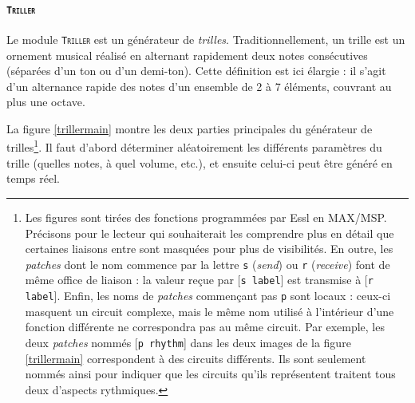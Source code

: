 \documentclass[a4paper,12pt]{article}
\newcommand{\module}[1]{\texttt{\textsc{#1}}}
\newcommand{\patch}[1]{[\texttt{#1}]}
\begin{document}
\paragraph{\module{Triller} \\} %

Le module \module{Triller} est un générateur de \emph{trilles}. Traditionnellement, un trille est un ornement musical réalisé en alternant rapidement deux notes consécutives (séparées d'un ton ou d'un demi-ton). Cette définition est ici élargie : il s'agit d'un alternance rapide des notes d'un ensemble de 2 à 7 éléments, couvrant au plus une octave.

La figure \ref{trillermain} montre les deux parties principales du générateur de trilles\footnote{Les figures sont tirées des fonctions programmées par Essl en MAX/MSP. Précisons pour le lecteur qui souhaiterait les comprendre plus en détail que certaines liaisons entre sont masquées pour plus de visibilités. En outre, les \emph{patches} dont le nom commence par la lettre \texttt{s} (\emph{send}) ou \texttt{r} (\emph{receive}) font de même office de liaison : la valeur reçue par \patch{s label} est transmise à \patch{r label}. Enfin, les noms de \emph{patches} commençant pas \texttt{p} sont locaux : ceux-ci masquent un circuit complexe, mais le même nom utilisé à l'intérieur d'une fonction différente ne correspondra pas au même circuit. Par exemple, les deux \emph{patches} nommés \patch{p rhythm} dans les deux images de la figure \ref{trillermain} correspondent à des circuits différents. Ils sont seulement nommés ainsi pour indiquer que les circuits qu'ils représentent traitent tous deux d'aspects rythmiques.}. Il faut d'abord déterminer aléatoirement les différents paramètres du trille (quelles notes, à quel volume, etc.), et ensuite celui-ci peut être généré en temps réel.
\end{document}
